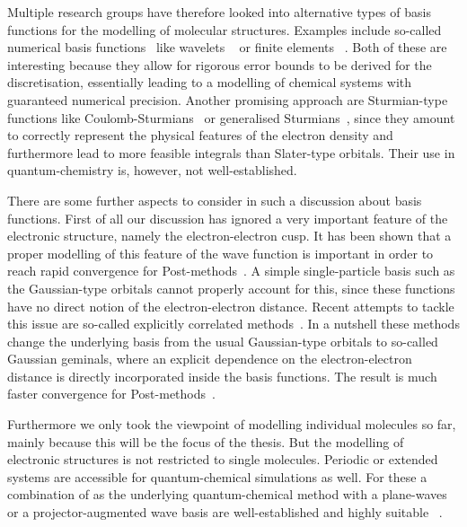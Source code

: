 Multiple research groups have therefore looked
into alternative types of basis functions
for the modelling of molecular structures.
Examples include so-called numerical basis functions~\cite{Frediani2015}
like wavelets%
~\cite{Bischoff2011,Bischoff2012,Bischoff2013,Bischoff2014,Bischoff2014a,Bischoff2017}
or finite elements%
~\cite{Tsuchida1995,Soler2002,Lehtovaara2009,Alizadegan2010,Avery2011PhD,Davydov2015,Boffi2016}.
Both of these are interesting because they allow for rigorous error bounds
to be derived for the discretisation,
essentially leading to a modelling of chemical systems with guaranteed
numerical precision.
Another promising approach are Sturmian-type functions
like Coulomb-Sturmians~\cite{Shull1959,Rotenberg1962,Rotenberg1970,Gruzdev1990,Hoggan2009,Randazzo2010}
or generalised Sturmians~\cite{Avery2006,Avery2011PhD,Avery2011,Morales2016,Avery2017,Randazzo2015,Granados2016},
since they amount to correctly represent
the physical features of the electron density
and furthermore lead to more feasible integrals than Slater-type orbitals.
Their use in quantum-chemistry is, however, not well-established.

There are some further aspects to consider in such a discussion about basis functions.
First of all our discussion has ignored
a very important feature of the electronic structure,
namely the electron-electron cusp.
It has been shown that a proper modelling of this feature of the wave function
is important in order to reach rapid convergence for Post-\HF methods~\cite{Kong2012}.
A simple single-particle basis such as the Gaussian-type
orbitals cannot properly account for this,
since these functions have no direct notion of the electron-electron distance.
Recent attempts to tackle this issue are so-called
explicitly correlated methods~\cite{Kong2012}.
In a nutshell these methods change the underlying
basis from the usual Gaussian-type orbitals to so-called Gaussian geminals,
where an explicit dependence on the electron-electron
distance is directly incorporated inside the basis functions.
The result is much faster convergence for Post-\HF methods~\cite{Kong2012}.

Furthermore we only took the viewpoint of modelling
individual molecules so far, mainly because this will be the focus of the thesis.
But the modelling of electronic structures is not restricted to single molecules.
Periodic or extended systems are accessible
for quantum-chemical simulations as well.
For these a combination of \DFT as the underlying quantum-chemical method
with a plane-waves or a projector-augmented wave basis
are well-established and highly suitable%
~\cite{Kresse1996,Kresse1999,Mortensen2005,Enkovaara2010}.

